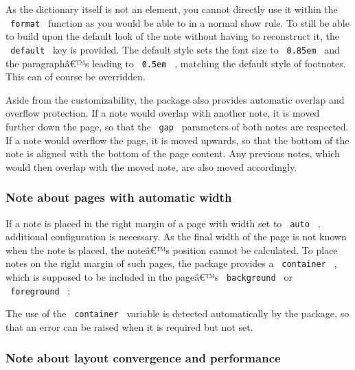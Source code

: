 As the dictionary itself is not an element, you cannot directly use it
within the \texttt{\ format\ } function as you would be able to in a
normal show rule. To still be able to build upon the default look of the
note without having to reconstruct it, the \texttt{\ default\ } key is
provided. The default style sets the font size to \texttt{\ 0.85em\ }
and the paragraphâ€™s leading to \texttt{\ 0.5em\ } , matching the
default style of footnotes. This can of course be overridden.

Aside from the customizability, the package also provides automatic
overlap and overflow protection. If a note would overlap with another
note, it is moved further down the page, so that the \texttt{\ gap\ }
parameters of both notes are respected. If a note would overflow the
page, it is moved upwards, so that the bottom of the note is aligned
with the bottom of the page content. Any previous notes, which would
then overlap with the moved note, are also moved accordingly.

\subsubsection{Note about pages with automatic
width}\label{note-about-pages-with-automatic-width}

If a note is placed in the right margin of a page with width set to
\texttt{\ auto\ } , additional configuration is necessary. As the final
width of the page is not known when the note is placed, the noteâ€™s
position cannot be calculated. To place notes on the right margin of
such pages, the package provides a \texttt{\ container\ } , which is
supposed to be included in the pageâ€™s \texttt{\ background\ } or
\texttt{\ foreground\ } :

\begin{Shaded}
\begin{Highlighting}[]


\end{Highlighting}
\end{Shaded}

The use of the \texttt{\ container\ } variable is detected automatically
by the package, so that an error can be raised when it is required but
not set.

\subsubsection{Note about layout convergence and
performance}\label{note-about-layout-convergence-and-performance}

